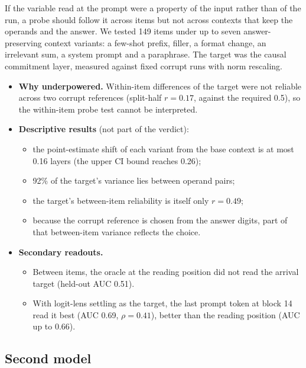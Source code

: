 \documentclass[11pt]{article}
\begin{document}
If the variable read at the prompt were a property of the input rather than of the run, a probe should follow it across items but not across contexts that keep the operands and the answer. We tested 149 items under up to seven answer-preserving context variants: a few-shot prefix, filler, a format change, an irrelevant sum, a system prompt and a paraphrase. The target was the causal commitment layer, measured against fixed corrupt runs with norm rescaling.
\begin{itemize}
\item \textbf{Why underpowered.} Within-item differences of the target were not reliable across two corrupt references (split-half $r = 0.17$, against the required 0.5), so the within-item probe test cannot be interpreted.
\item \textbf{Descriptive results} (not part of the verdict):
  \begin{itemize}
  \item the point-estimate shift of each variant from the base context is at most 0.16 layers (the upper CI bound reaches 0.26);
  \item 92\% of the target's variance lies between operand pairs;
  \item the target's between-item reliability is itself only $r = 0.49$;
  \item because the corrupt reference is chosen from the answer digits, part of that between-item variance reflects the choice.
  \end{itemize}
\item \textbf{Secondary readouts.}
  \begin{itemize}
  \item Between items, the oracle at the reading position did not read the arrival target (held-out AUC 0.51).
  \item With logit-lens settling as the target, the last prompt token at block 14 read it best (AUC 0.69, $\rho = 0.41$), better than the reading position (AUC up to 0.66).
  \end{itemize}
\end{itemize}

\subsection{Second model}
\end{document}
